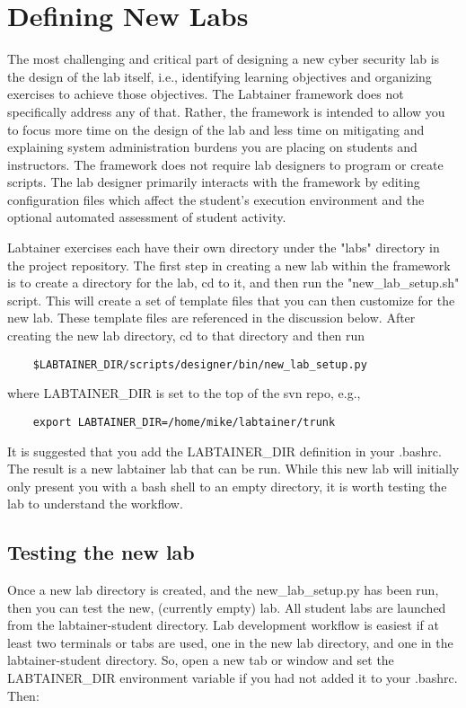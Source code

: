 \documentclass{article}
\begin{document}
\section {Defining New Labs}
\label{sec:new_labs}
The most challenging and critical part of designing a new cyber security lab
is the design of the lab itself, i.e., identifying learning objectives and
organizing exercises to achieve those objectives.  The Labtainer framework
does not specifically address any of that.  Rather, the framework is intended
to allow you to focus more time on the design of the lab and less time on mitigating and
explaining system administration burdens you are placing on students and instructors.
The framework does not require lab designers to program or create scripts.  The
lab designer primarily interacts with the framework by editing configuration files
which affect the student's execution environment and the optional automated
assessment of student activity.

Labtainer exercises each have their own
directory under the "labs" directory in the project repository.
The first step in creating a new lab within the framework is to create
a directory for the lab, cd to it, and then run the "new\_lab\_setup.sh" script.
This will create a set of template files that you can then customize
for the new lab.  These template files are referenced in the discussion
below.  After creating the new lab directory, cd to that directory and then run

\begin{verbatim}
    $LABTAINER_DIR/scripts/designer/bin/new_lab_setup.py
\end{verbatim}
where LABTAINER\_DIR is set to the top of the svn repo, e.g.,

\begin{verbatim}
    export LABTAINER_DIR=/home/mike/labtainer/trunk
\end{verbatim}
It is suggested that you add the LABTAINER\_DIR definition in your .bashrc.
The result is a new labtainer lab that can be run.  While this new
lab will initially only present you with a bash shell to an
empty directory, it is worth testing the lab to understand the workflow.

\subsection{Testing the new lab}
Once a new lab directory is created, and the new\_lab\_setup.py has been run, then 
you can test the new, (currently empty) lab.  All student labs are launched from the
labtainer-student directory.  Lab development workflow is easiest if at least two
terminals or tabs are used, one in the new lab directory, and one in the labtainer-student
directory.  So, open a new tab or window and set the LABTAINER\_DIR environment variable
if you had not added it to your .bashrc.  Then:
\end{document}
